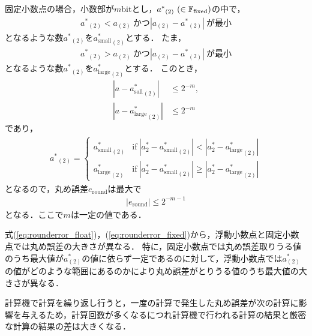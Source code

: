 固定小数点の場合，小数部が$m$bitとし，${a^{\ast}}_{(2)} \ (\in\mathbb{F}_{\text{fixed}})$の中で，
\begin{align*}
    {a^{\ast}}_{(2)} < a_{(2)}\ \text{かつ} |a_{(2)} - {a^{\ast}}_{(2)}| \ \text{が最小}
\end{align*}
となるような数${a^{\ast}}_{(2)}$を${a^{\ast}_{\mathrm{small}}}_{(2)}$とする．
たま，
\begin{align*}
    {a^{\ast}}_{(2)} > a_{(2)} \ \text{かつ} |a_{(2)} - {a^{\ast}}_{(2)}| \ \text{が最小}
\end{align*}
となるような数${a^{\ast}}_{(2)}$を${a^{\ast}_{\mathrm{large}}}_{(2)}$とする．
このとき，
\begin{align}
    |a - {a^{\ast}_{\mathrm{sall}}}_{(2)}| &\leq 2^{-m}, \\
    |a - {a^{\ast}_{\mathrm{large}}}_{(2)}| &\leq 2^{-m}
\end{align}
であり，
\begin{align*}
    {a^{\ast}}_{(2)} = \left\{ 
        \begin{array}{ll}
            {a^{\ast}_{\mathrm{small}}}_{(2)} &\text{if} \ |a^{\ast}_{2} - {a^{\ast}_{\mathrm{small}}}_{(2)} | < |a^{\ast}_{2} - {a^{\ast}_{\mathrm{large}}}_{(2)} | \\
            {a^{\ast}_{\mathrm{large}}}_{(2)} &\text{if} \ |a^{\ast}_{2} - {a^{\ast}_{\mathrm{small}}}_{(2)} | \geq |a^{\ast}_{2} - {a^{\ast}_{\mathrm{large}}}_{(2)} | 
        \end{array}
    \right.
\end{align*}
となるので，丸め誤差$e_{\mathrm{round}}$は最大で
\begin{align}
    \label{eq:rounderror_fixed}
    |e_{\mathrm{round}}| \leq 2^{-m-1}
\end{align}
となる．ここで$m$は一定の値である．


式(\ref{eq:rounderror_float})，(\ref{eq:rounderror_fixed})から，浮動小数点と固定小数点では丸め誤差の大きさが異なる．
特に，固定小数点では丸め誤差取りうる値のうち最大値が$a^{\ast}_{(2)}$の値に依らず一定であるのに対して，浮動小数点では$a^{\ast}_{(2)}$の値がどのような範囲にあるのかにより丸め誤差がとりうる値のうち最大値の大きさが異なる．


計算機で計算を繰り返し行うと，一度の計算で発生した丸め誤差が次の計算に影響を与えるため，計算回数が多くなるにつれ計算機で行われる計算の結果と厳密な計算の結果の差は大きくなる．

